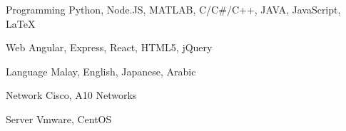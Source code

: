 

\begin{cvskills}

  \cvskill
    {Programming} %
    {Python, Node.JS, MATLAB, C/C\#/C++, JAVA, JavaScript, \LaTeX} %

  \cvskill
    {Web} %
    {Angular, Express, React, HTML5, jQuery} %

  \cvskill
    {Language} %
    {Malay, English, Japanese, Arabic} %

  \cvskill
    {Network} %
    {Cisco, A10 Networks} %

  \cvskill
    {Server} %
    {Vmware, CentOS} %

\end{cvskills}
